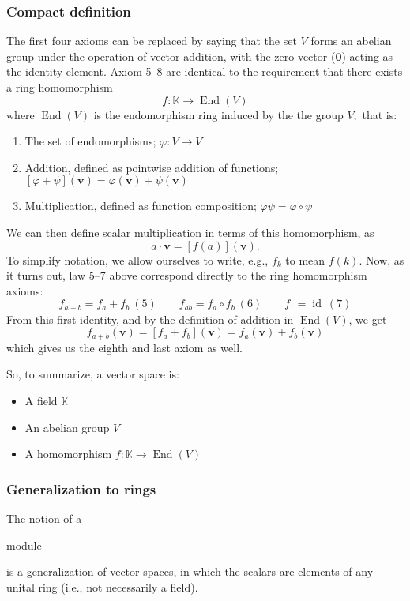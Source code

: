 \documentclass{article}
\DeclareMathOperator{\End}{End}
\DeclareMathOperator{\id}{id}
\newenvironment{itemized}{ 
\begin{itemize}
\setlength{\itemsep}{0pt}
\setlength{\parskip}{0pt}
\setlength{\parsep}{0pt}     
}{\end{itemize}}
\newenvironment{enumerated}{ 
\begin{enumerate}
\setlength{\itemsep}{0pt}
\setlength{\parskip}{0pt}
\setlength{\parsep}{0pt}     
}{\end{enumerate}}
\renewcommand{\vec}[1]{\mathbf{#1}}
\begin{document}
\subsubsection*{Compact definition}

The first four axioms can be replaced by saying that the set $V$ forms an abelian group under the operation of vector addition, with the zero vector ($\vec{0}$) acting as the identity element.
Axiom 5--8 are identical to the requirement that there exists a ring homomorphism
$$ f : \mathbb{K} \rightarrow \End(V) $$
where $\End(V)$ is the endomorphism ring induced by the the group $V,$ that is:
\begin{enumerated}
  \item The set of endomorphisms; $\varphi : V \rightarrow V$
  \item Addition, defined as pointwise addition of functions; $ \left[\varphi + \psi\right](\vec{v}) = \varphi(\vec{v}) + \psi(\vec{v})$
  \item Multiplication, defined as function composition; $ \varphi\psi = \varphi \circ \psi$
\end{enumerated}
We can then define scalar multiplication in terms of this homomorphism, as
$$ a \cdot \vec{v} = [f(a)](\vec{v}). $$
To simplify notation, we allow ourselves to write, e.g., $f_k$ to mean $f(k)$. 
Now, as it turns out, law 5--7 above correspond directly to the ring homomorphism axioms:
$$
f_{a + b} = f_a + f_b \ (5) \quad \quad 
f_{ab} = f_a \circ f_b \ (6) \quad \quad 
f_1 = \id \ (7)
$$
From this first identity, and by the definition of addition in $\End(V)$, we get 
$$ f_{a + b}(\vec{v}) = [f_a + f_b](\vec{v}) = f_a(\vec{v}) + f_b(\vec{v}) $$
which gives us the eighth and last axiom as well.

So, to summarize, a vector space is:
\begin{itemized}
  \item A field $\mathbb{K}$ 
  \item An abelian group $V$
  \item A homomorphism $f : \mathbb{K} \rightarrow \End(V)$
\end{itemized}

\subsubsection*{Generalization to rings}
The notion of a \begin{em}module\end{em} is a generalization of vector spaces, in which the scalars are elements of any unital ring (i.e., not necessarily a field).
\end{document}
